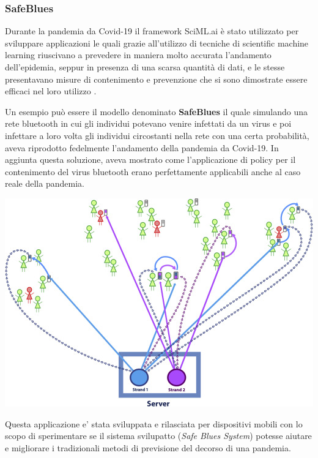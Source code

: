 \subsubsection{SafeBlues}
Durante la pandemia da Covid-19 il framework SciML.ai è stato 
utilizzato per sviluppare applicazioni le quali grazie 
all’utilizzo di tecniche di scientific machine learning 
riuscivano a prevedere in maniera molto accurata l’andamento 
dell’epidemia, seppur in presenza di una scarsa quantità di dati,
e le stesse presentavano misure di contenimento e prevenzione 
che si sono dimostrate essere efficaci nel loro utilizzo
\cite{10.1371/journal.pdig.0000142} \cite{DANDEKAR2021100220}. 

Un esempio può essere il modello denominato \textbf{SafeBlues} 
\cite{10.1371/journal.pdig.0000142} \cite{DANDEKAR2021100220} 
il quale simulando una rete bluetooth in cui gli individui potevano 
venire infettati da un virus e poi infettare a loro volta gli 
individui circostanti nella rete con una certa probabilità, 
aveva riprodotto fedelmente l’andamento della pandemia da Covid-19. 
In aggiunta questa soluzione, aveva mostrato come 
l’applicazione di policy per il contenimento del virus 
bluetooth erano perfettamente applicabili anche al caso 
reale della pandemia.

\begin{minipage}{\linewidth}
    \centering
    \includegraphics[width=\textwidth]{img/gr2.jpg}
    \label{fig:SafeBlues_1}
\end{minipage}

Questa applicazione e' stata sviluppata e rilasciata per dispositivi
mobili con lo scopo di sperimentare se il sistema svilupatto (\emph{Safe Blues System})
potesse aiutare e migliorare i tradizionali metodi di previsione 
del decorso di una pandemia.

